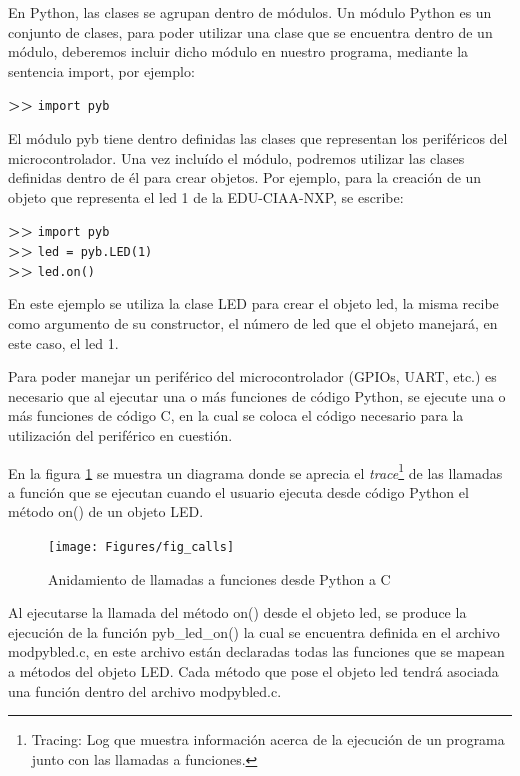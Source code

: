 En Python, las clases se agrupan dentro de módulos. Un módulo Python es un conjunto de clases, para poder utilizar una clase que se encuentra dentro de un módulo, deberemos incluir dicho módulo en nuestro programa, mediante la sentencia import, por ejemplo:

\textbf{{\fontsize{16}{16}\selectfont \textgreater\textgreater}} \texttt{import pyb}

El módulo pyb tiene dentro definidas las clases que representan los periféricos del microcontrolador. Una vez incluído el módulo, podremos utilizar las clases definidas dentro de él para crear objetos.
Por ejemplo, para la creación de un objeto que representa el led 1 de la EDU-CIAA-NXP, se escribe:

\textbf{{\fontsize{16}{16}\selectfont \textgreater\textgreater}} \texttt{import pyb}\\
\textbf{{\fontsize{16}{16}\selectfont \textgreater\textgreater}} \texttt{led = pyb.LED(1)}\\
\textbf{{\fontsize{16}{16}\selectfont \textgreater\textgreater}} \texttt{led.on()}

En este ejemplo se utiliza la clase LED para crear el objeto led, la misma recibe como argumento de su constructor, el número de led que el objeto manejará, en este caso, el led 1.

Para poder manejar un periférico del microcontrolador (GPIOs, UART, etc.) es necesario que al ejecutar una o más funciones de código Python, se ejecute una o más funciones de código C, en la cual se coloca el código necesario para la utilización del periférico en cuestión.

En la figura \ref{fig:calls} se muestra un diagrama donde se aprecia el \textit{trace}\footnote{Tracing: Log que muestra información acerca de la ejecución de un programa junto con las llamadas a funciones.} de las llamadas a función que se ejecutan cuando el usuario ejecuta desde código Python el método on() de un objeto LED.

\begin{figure}[ht]
  \centering
    \texttt{[image: Figures/fig\_calls]}
  \caption{Anidamiento de llamadas a funciones desde Python a C}
  \label{fig:calls}
\end{figure}

Al ejecutarse la llamada del método on() desde el objeto led, se produce la ejecución de la función pyb\_led\_on() la cual se encuentra definida en el archivo modpybled.c, en este archivo están declaradas todas las funciones que se mapean a métodos del objeto LED. Cada método que pose el objeto led tendrá asociada una función dentro del archivo modpybled.c.

